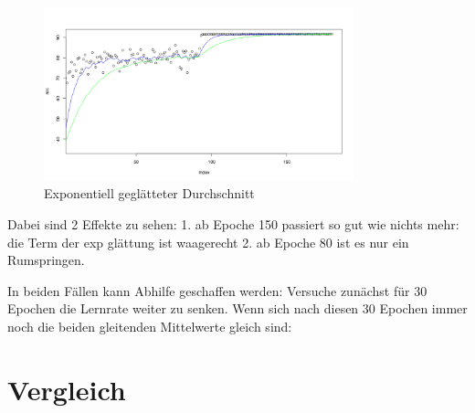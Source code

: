 \begin{figure}[h]
 \centering
 \includegraphics[width=0.8\textwidth]{KapitelPartB/expmean.png}
 \caption{Exponentiell geglätteter Durchschnitt}
 \label{abb:egd}
\end{figure}

Dabei sind 2 Effekte zu sehen:
1. ab Epoche 150 passiert so gut wie nichts mehr: die Term der exp glättung ist waagerecht
2. ab Epoche 80 ist es nur ein Rumspringen.

In beiden Fällen kann Abhilfe geschaffen werden: Versuche zunächst für 30 Epochen die Lernrate weiter zu senken. Wenn sich nach diesen 30 Epochen immer noch die beiden gleitenden Mittelwerte gleich sind:







\chapter{Vergleich}\label{sec:vergleich}


